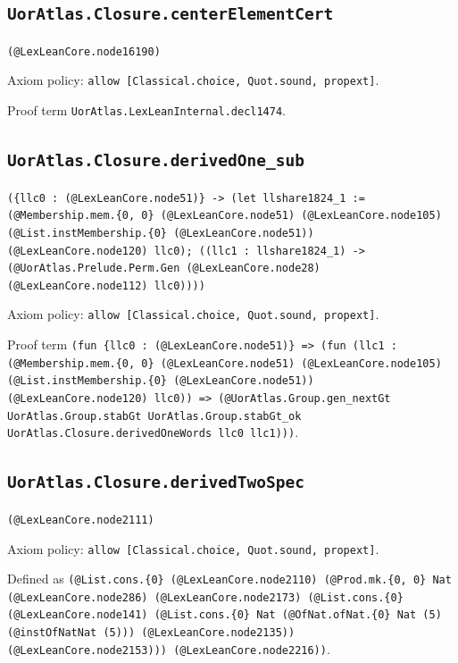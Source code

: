 \documentclass[11pt]{article}
\begin{document}
\subsection*{\texttt{UorAtlas.Closure.centerElementCert}}
\noindent\texttt{(@LexLeanCore.node16190)}\par
\noindent Axiom policy: \texttt{allow [Classical.choice, Quot.sound, propext]}.\par
\noindent Proof term \texttt{UorAtlas.LexLeanInternal.decl1474}.\par
\subsection*{\texttt{UorAtlas.Closure.derivedOne\_sub}}
\noindent\texttt{(\{llc0 : (@LexLeanCore.node51)\} -> (let llshare1824\_1 := (@Membership.mem.\{0, 0\} (@LexLeanCore.node51) (@LexLeanCore.node105) (@List.instMembership.\{0\} (@LexLeanCore.node51)) (@LexLeanCore.node120) llc0); ((llc1 : llshare1824\_1) -> (@UorAtlas.Prelude.Perm.Gen (@LexLeanCore.node28) (@LexLeanCore.node112) llc0))))}\par
\noindent Axiom policy: \texttt{allow [Classical.choice, Quot.sound, propext]}.\par
\noindent Proof term \texttt{(fun \{llc0 : (@LexLeanCore.node51)\} => (fun (llc1 : (@Membership.mem.\{0, 0\} (@LexLeanCore.node51) (@LexLeanCore.node105) (@List.instMembership.\{0\} (@LexLeanCore.node51)) (@LexLeanCore.node120) llc0)) => (@UorAtlas.Group.gen\_nextGt UorAtlas.Group.stabGt UorAtlas.Group.stabGt\_ok UorAtlas.Closure.derivedOneWords llc0 llc1)))}.\par
\subsection*{\texttt{UorAtlas.Closure.derivedTwoSpec}}
\noindent\texttt{(@LexLeanCore.node2111)}\par
\noindent Axiom policy: \texttt{allow [Classical.choice, Quot.sound, propext]}.\par
\noindent Defined as \texttt{(@List.cons.\{0\} (@LexLeanCore.node2110) (@Prod.mk.\{0, 0\} Nat (@LexLeanCore.node286) (@LexLeanCore.node2173) (@List.cons.\{0\} (@LexLeanCore.node141) (@List.cons.\{0\} Nat (@OfNat.ofNat.\{0\} Nat (5) (@instOfNatNat (5))) (@LexLeanCore.node2135)) (@LexLeanCore.node2153))) (@LexLeanCore.node2216))}.\par
\end{document}
